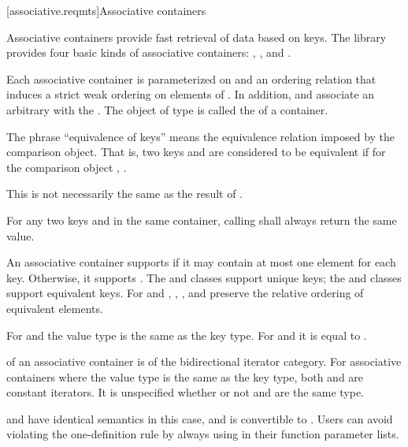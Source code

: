[associative.reqmts]{Associative containers}

\pnum
Associative containers provide fast retrieval of data based on keys.
The library provides four basic kinds of associative containers:
,
,
and
.

\pnum
Each associative container is parameterized on
and an ordering relation
that induces a strict weak ordering on
elements of
.
In addition,
and
associate an arbitrary 
with the
.
The object of type
is called the
of a container.

\pnum
The phrase ``equivalence of keys'' means the equivalence relation imposed by the
comparison object.
That is, two keys
and
are considered to be equivalent if for the
comparison object
,
.
\begin{note}
This is not necessarily the same as the result of .
\end{note}
For any two keys
and
in the same container, calling
shall always return the same value.

\pnum
An associative container supports  if it may contain at
most one element for each key. Otherwise, it supports .
The  and  classes support unique keys; the 
and  classes support equivalent keys.
For  and ,
, , and  preserve the relative ordering
of equivalent elements.

\pnum
For  and  the value type is the same as the key type.
For  and  it is equal to .

\pnum
{}
of an associative container is of the bidirectional iterator category.
For associative containers where the value type is the same as the key type, both
and
are constant iterators. It is unspecified whether or not
and
are the same type.
\begin{note}  and  have identical semantics in this case, and  is convertible to . Users can avoid violating the one-definition rule by always using  in their function parameter lists. \end{note}

